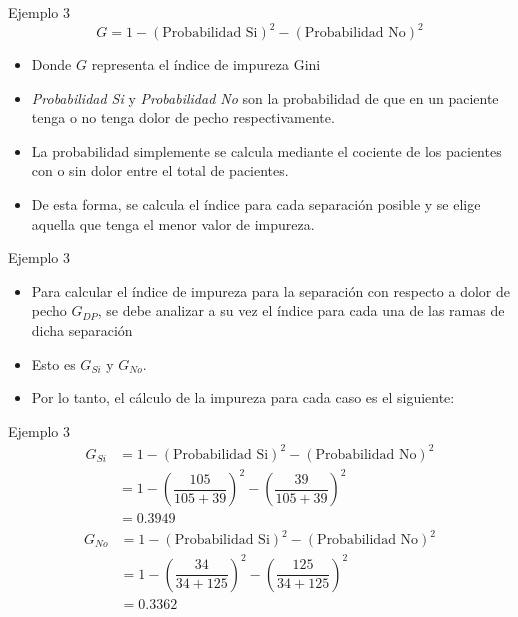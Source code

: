 \documentclass[11pt,aspectratio=169]{beamer}
\begin{document}
\begin{frame}{Ejemplo 3}
	\begin{equation}
		G = 1 - (\mbox{Probabilidad Si})^2 - (\mbox{Probabilidad No})^2 
		\label{eq:gini}
	\end{equation}
	\begin{itemize}
		\item Donde $G$ representa el índice de impureza Gini \pause
		\item \textit{Probabilidad Si} y \textit{Probabilidad No} son la probabilidad de que en un paciente tenga 
			o no tenga dolor de pecho respectivamente.\pause
		\item La probabilidad simplemente se calcula mediante el cociente de los pacientes con o sin dolor entre 
			el total de pacientes.\pause
		\item De esta forma, se calcula el índice para cada separación posible y se elige aquella que tenga el 
			menor valor de impureza. 
	\end{itemize}	
\end{frame}

\begin{frame}{Ejemplo 3}
	\begin{itemize}
		\item Para calcular el índice de impureza para la separación con respecto a dolor de pecho $G_{DP}$, 
		se debe analizar a su vez el índice para cada una de las ramas de dicha separación\pause
		\item Esto es $G_{Si}$ y $G_{No}$.\pause
		\item Por lo tanto, el cálculo de la impureza para cada caso es el siguiente:
	\end{itemize}
\end{frame}

\begin{frame}{Ejemplo 3}
	\begin{align*}
		G_{Si} &= 1 - (\mbox{Probabilidad Si})^2 - (\mbox{Probabilidad No})^2  \\
			&= 1-\left(\dfrac{105}{105+39}\right)^2 -\left(\dfrac{39}{105+39} \right)^2\\ 
			&= 0.3949 
	\end{align*}\pause
	\begin{align*}
		G_{No} &= 1- (\mbox{Probabilidad Si})^2 - (\mbox{Probabilidad No})^2  \\
			&= 1-\left(\dfrac{34}{34+125}\right)^2 -\left(\dfrac{125}{34+125} \right)^2\\
			&= 0.3362
	\end{align*}
\end{frame}
\end{document}
